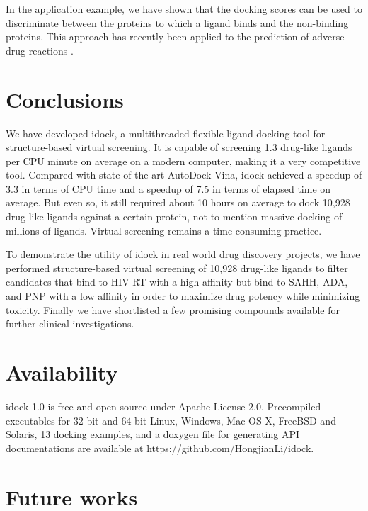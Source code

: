 In the application example, we have shown that the docking scores can be used to discriminate between the proteins to which a ligand binds and the non-binding proteins. This approach has recently been applied to the prediction of adverse drug reactions \citep{1563}.

\section{Conclusions}

We have developed idock, a multithreaded flexible ligand docking tool for structure-based virtual screening. It is capable of screening 1.3 drug-like ligands per CPU minute on average on a modern computer, making it a very competitive tool. Compared with state-of-the-art AutoDock Vina, idock achieved a speedup of 3.3 in terms of CPU time and a speedup of 7.5 in terms of elapsed time on average. But even so, it still required about 10 hours on average to dock 10,928 drug-like ligands against a certain protein, not to mention massive docking of millions of ligands. Virtual screening remains a time-consuming practice.

To demonstrate the utility of idock in real world drug discovery projects, we have performed structure-based virtual screening of 10,928 drug-like ligands to filter candidates that bind to HIV RT with a high affinity but bind to SAHH, ADA, and PNP with a low affinity in order to maximize drug potency while minimizing toxicity. Finally we have shortlisted a few promising compounds available for further clinical investigations.

\section{Availability}

idock 1.0 is free and open source under Apache License 2.0. Precompiled executables for 32-bit and 64-bit Linux, Windows, Mac OS X, FreeBSD and Solaris, 13 docking examples, and a doxygen file for generating API documentations are available at https://github.com/HongjianLi/idock.

\section{Future works}

